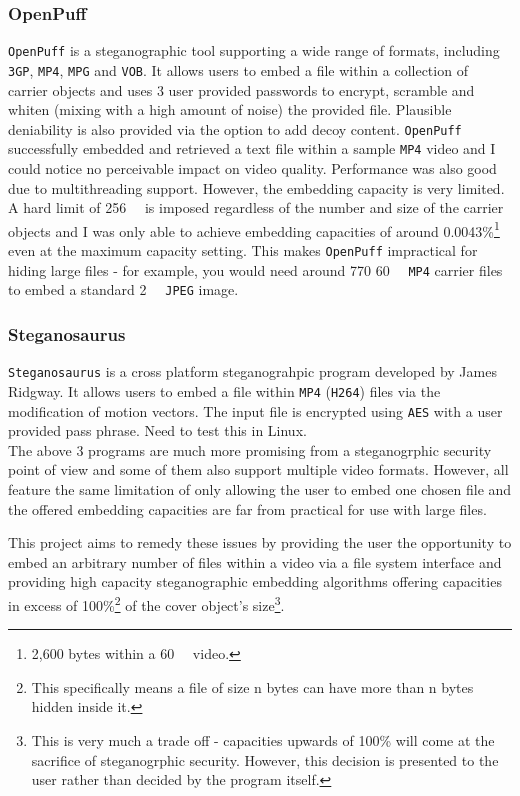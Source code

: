 \documentclass[paper=a4, fontsize=11pt,twoside]{scrartcl}    %
\numberwithin{table}{section}
\numberwithin{figure}{section}
\begin{document}
\subsubsection{OpenPuff}

\texttt{OpenPuff} is a steganographic tool supporting a wide range of formats, including \texttt{3GP}, \texttt{MP4}, \texttt{MPG} and \texttt{VOB}. It allows users to embed a file within a collection of carrier objects and uses 3 user provided passwords to encrypt, scramble and whiten (mixing with a high amount of noise) the provided file. Plausible deniability is also provided via the option to add decoy content. \texttt{OpenPuff} successfully embedded and retrieved a text file within a sample \texttt{MP4} video and I could notice no perceivable impact on video quality. Performance was also good due to multithreading support. However, the embedding capacity is very limited. A hard limit of \SI{256}{\mega\byte} is imposed regardless of the number and size of the carrier objects and I was only able to achieve embedding capacities of around 0.0043\%\footnote{2,600 bytes within a \SI{60}{\mega\byte} video.} even at the maximum capacity setting. This makes \texttt{OpenPuff} impractical for hiding large files - for example, you would need around 770 \SI{60}{\mega\byte} \texttt{MP4} carrier files to embed a standard \SI{2}{\mega\byte} \texttt{JPEG} image.

\subsubsection{Steganosaurus}

\texttt{Steganosaurus} is a cross platform steganograhpic program developed by James Ridgway. It allows users to embed a file within \texttt{MP4} (\texttt{H264}) files via the modification of motion vectors. The input file is encrypted using \texttt{AES} with a user provided pass phrase. Need to test this in Linux.\\

\noindent
The above 3 programs are much more promising from a steganogrphic security point of view and some of them also support multiple video formats. However, all feature the same limitation of only allowing the user to embed one chosen file and the offered embedding capacities are far from practical for use with large files.

This project aims to remedy these issues by providing the user the opportunity to embed an arbitrary number of files within a video via a file system interface and providing high capacity steganographic embedding algorithms offering capacities in excess of 100\%\footnote{This specifically means a file of size n bytes can have more than n bytes hidden inside it.} of the cover object's size\footnote{This is very much a trade off - capacities upwards of 100\% will come at the sacrifice of steganogrphic security. However, this decision is presented to the user rather than decided by the program itself.}. 
\end{document}
